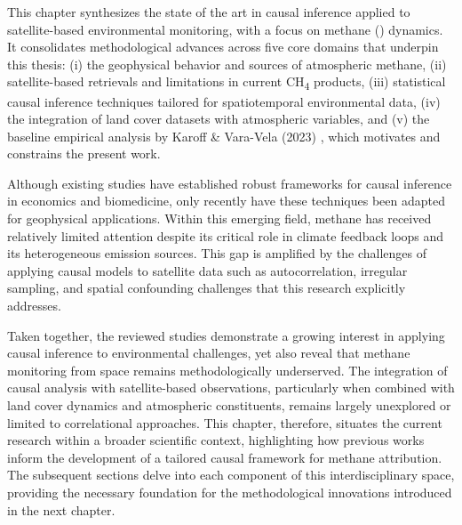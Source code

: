 \cleardoublepage
\label{chap:back}


This chapter synthesizes the state of the art in causal inference applied to satellite-based environmental monitoring, with a focus on methane () dynamics. It consolidates methodological advances across five core domains that underpin this thesis: (i) the geophysical behavior and sources of atmospheric methane, (ii) satellite-based retrievals and limitations in current CH\textsubscript{4} products, (iii) statistical causal inference techniques tailored for spatiotemporal environmental data, (iv) the integration of land cover datasets with atmospheric variables, and (v) the baseline empirical analysis by Karoff \& Vara-Vela (2023) \cite{Karoff2023}, which motivates and constrains the present work.

Although existing studies have established robust frameworks for causal inference in economics and biomedicine, only recently have these techniques been adapted for geophysical applications. Within this emerging field, methane has received relatively limited attention despite its critical role in climate feedback loops and its heterogeneous emission sources. This gap is amplified by the challenges of applying causal models to satellite data such as autocorrelation, irregular sampling, and spatial confounding challenges that this research explicitly addresses.

Taken together, the reviewed studies demonstrate a growing interest in applying causal inference to environmental challenges, yet also reveal that methane monitoring from space remains methodologically underserved. The integration of causal analysis with satellite-based observations, particularly when combined with land cover dynamics and atmospheric constituents, remains largely unexplored or limited to correlational approaches. This chapter, therefore, situates the current research within a broader scientific context, highlighting how previous works inform the development of a tailored causal framework for methane attribution. The subsequent sections delve into each component of this interdisciplinary space, providing the necessary foundation for the methodological innovations introduced in the next chapter.


